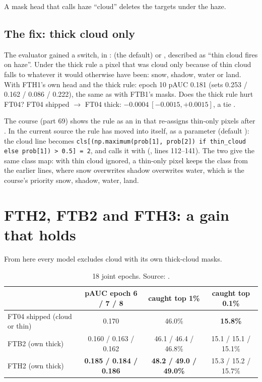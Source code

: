 \begin{keypoint}
A mask head that calls haze ``cloud'' deletes the targets under the haze.
\end{keypoint}

\subsection{The fix: thick cloud only}

The evaluator gained a switch,  in :
 (the default) or , described as ``thin cloud fires on haze''. Under the thick
rule a pixel that was cloud only because of thin cloud falls to whatever it would otherwise have been: snow,
shadow, water or land. With FTH1's own head and the thick rule: epoch 10 pAUC 0.181 (sets 0.253 / 0.162 / 0.086 /
0.222), the same as with FTB1's masks. Does the thick rule hurt FT04? FT04 shipped $\to$ FT04 thick:
$-0.0004\ [-0.0015,+0.0015]$, a tie .

\begin{sourcenote}
The course (part 69) shows the rule as an  in  that re-assigns
thin-only pixels after . In the current source the rule has moved into
 itself, as a parameter  (default ): the cloud line becomes
\lstinline!cls[(np.maximum(prob[1], prob[2]) if thin_cloud else prob[1]) > 0.5] = 2!, and  calls it with
(, lines 112--141). The two give the same class
map: with thin cloud ignored, a thin-only pixel keeps the class from the earlier lines, where snow overwrites
shadow overwrites water, which is the course's priority snow, shadow, water, land.
\end{sourcenote}

\section{FTH2, FTB2 and FTH3: a gain that holds}\label{sec:heavy:fth2}

From here every model excludes cloud with its own thick-cloud masks.

\begin{table}[htbp]
\centering\small
\begin{tabular}{lccc}
\toprule
 & pAUC epoch 6 / 7 / 8 & caught top 1\% & caught top 0.1\%\\
\midrule
FT04 shipped (cloud or thin) & 0.170 & 46.0\% & \textbf{15.8\%}\\
FTB2 (own thick) & 0.160 / 0.163 / 0.162 & 46.1 / 46.4 / 46.8\% & 15.1 / 15.1 / 15.1\%\\
FTH2 (own thick) & \textbf{0.185 / 0.184 / 0.186} & \textbf{48.2 / 49.0 / 49.0\%} & 15.3 / 15.2 / 15.7\%\\
\bottomrule
\end{tabular}
\caption{18 joint epochs. Source: .}
\label{tab:heavy:fth2}
\end{table}

